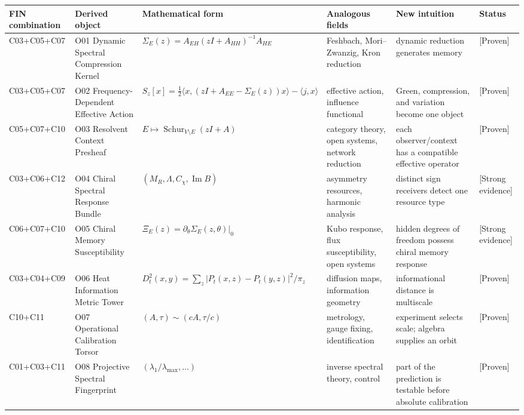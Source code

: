 \documentclass[11pt,a4paper,openany]{report}
\newcommand{\statusProven}{\textcolor{fingreen}{[Proven]}}
\newcommand{\statusStrong}{\textcolor{finblue}{[Strong evidence]}}
\begin{document}
\begin{center}
\begingroup\fontsize{7}{8.4}\selectfont
\setlength{\tabcolsep}{2.5pt}
\renewcommand{\arraystretch}{1.16}
\begin{longtable}{@{}p{}p{}p{}p{}p{}p{}@{}}
\toprule
\textbf{FIN combination} & \textbf{Derived object} & \textbf{Mathematical form} & \textbf{Analogous fields} & \textbf{New intuition} & \textbf{Status} \\
\midrule
\endhead
C03+\allowbreak{}C05+\allowbreak{}C07 & O01 Dynamic Spectral Compression Kernel & \(\Sigma_E(z)=A_{EH}(zI+A_{HH})^{-1}A_{HE}\) & Feshbach, Mori--Zwanzig, Kron reduction & dynamic reduction generates memory & \statusProven{} \\
C03+\allowbreak{}C05+\allowbreak{}C07 & O02 Frequency-Dependent Effective Action & \(S_z[x]=\frac12\langle x,(zI+A_{EE}-\Sigma_E(z))x\rangle-\langle j,x\rangle\) & effective action, influence functional & Green, compression, and variation become one object & \statusProven{} \\
C05+\allowbreak{}C07+\allowbreak{}C10 & O03 Resolvent Context Presheaf & \(E\mapsto\operatorname{Schur}_{V\setminus E}(zI+A)\) & category theory, open systems, network reduction & each observer/\allowbreak{}context has a compatible effective operator & \statusProven{} \\
C03+\allowbreak{}C06+\allowbreak{}C12 & O04 Chiral Spectral Response Bundle & \((M_R,\Lambda,C_\chi,\operatorname{Im}B)\) & asymmetry resources, harmonic analysis & distinct sign receivers detect one resource type & \statusStrong{} \\
C06+\allowbreak{}C07+\allowbreak{}C10 & O05 Chiral Memory Susceptibility & \(\Xi_E(z)=\partial_\theta\Sigma_E(z,\theta)|_0\) & Kubo response, flux susceptibility, open systems & hidden degrees of freedom possess chiral memory response & \statusStrong{} \\
C03+\allowbreak{}C04+\allowbreak{}C09 & O06 Heat Information Metric Tower & \(D_t^2(x,y)=\sum_z|P_t(x,z)-P_t(y,z)|^2/\pi_z\) & diffusion maps, information geometry & informational distance is multiscale & \statusProven{} \\
C10+\allowbreak{}C11 & O07 Operational Calibration Torsor & \((A,\tau)\sim(cA,\tau/c)\) & metrology, gauge fixing, identification & experiment selects scale; algebra supplies an orbit & \statusProven{} \\
C01+\allowbreak{}C03+\allowbreak{}C11 & O08 Projective Spectral Fingerprint & \((\lambda_1/\lambda_{\max},\ldots)\) & inverse spectral theory, control & part of the prediction is testable before absolute calibration & \statusProven{} \\

\end{longtable}
\end{center}
\end{document}
